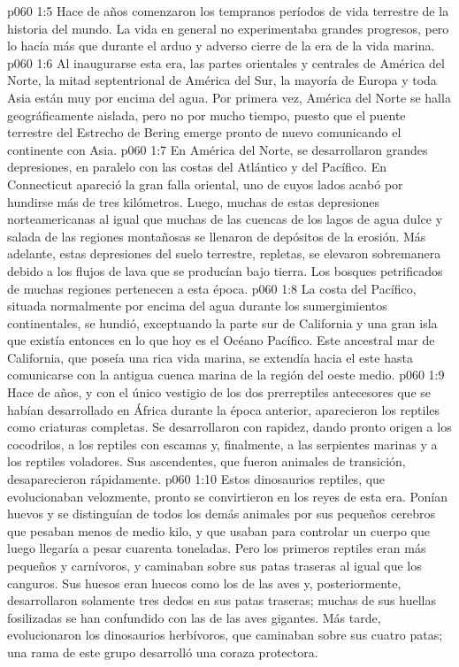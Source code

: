 \vs p060 1:5 \pc Hace  de años comenzaron los tempranos períodos de vida terrestre de la historia del mundo. La vida en general no experimentaba grandes progresos, pero lo hacía más que durante el arduo y adverso cierre de la era de la vida marina.
\vs p060 1:6 Al inaugurarse esta era, las partes orientales y centrales de América del Norte, la mitad septentrional de América del Sur, la mayoría de Europa y toda Asia están muy por encima del agua. Por primera vez, América del Norte se halla geográficamente aislada, pero no por mucho tiempo, puesto que el puente terrestre del Estrecho de Bering emerge pronto de nuevo comunicando el continente con Asia.
\vs p060 1:7 En América del Norte, se desarrollaron grandes depresiones, en paralelo con las costas del Atlántico y del Pacífico. En Connecticut apareció la gran falla oriental, uno de cuyos lados acabó por hundirse más de tres kilómetros. Luego, muchas de estas depresiones norteamericanas al igual que muchas de las cuencas de los lagos de agua dulce y salada de las regiones montañosas se llenaron de depósitos de la erosión. Más adelante, estas depresiones del suelo terrestre, repletas, se elevaron sobremanera debido a los flujos de lava que se producían bajo tierra. Los bosques petrificados de muchas regiones pertenecen a esta época.
\vs p060 1:8 La costa del Pacífico, situada normalmente por encima del agua durante los sumergimientos continentales, se hundió, exceptuando la parte sur de California y una gran isla que existía entonces en lo que hoy es el Océano Pacífico. Este ancestral mar de California, que poseía una rica vida marina, se extendía hacia el este hasta comunicarse con la antigua cuenca marina de la región del oeste medio.
\vs p060 1:9 \pc Hace  de años,  y con el único vestigio de los dos prerreptiles antecesores que se habían desarrollado en África durante la época anterior, aparecieron los reptiles como criaturas completas. Se desarrollaron con rapidez, dando pronto origen a los cocodrilos, a los reptiles con escamas y, finalmente, a las serpientes marinas y a los reptiles voladores. Sus ascendentes, que fueron animales de transición, desaparecieron rápidamente.
\vs p060 1:10 Estos dinosaurios reptiles, que evolucionaban velozmente, pronto se convirtieron en los reyes de esta era. Ponían huevos y se distinguían de todos los demás animales por sus pequeños cerebros que pesaban menos de medio kilo, y que usaban para controlar un cuerpo que luego llegaría a pesar cuarenta toneladas. Pero los primeros reptiles eran más pequeños y carnívoros, y caminaban sobre sus patas traseras al igual que los canguros. Sus huesos eran huecos como los de las aves y, posteriormente, desarrollaron solamente tres dedos en sus patas traseras; muchas de sus huellas fosilizadas se han confundido con las de las aves gigantes. Más tarde, evolucionaron los dinosaurios herbívoros, que caminaban sobre sus cuatro patas; una rama de este grupo desarrolló una coraza protectora.
